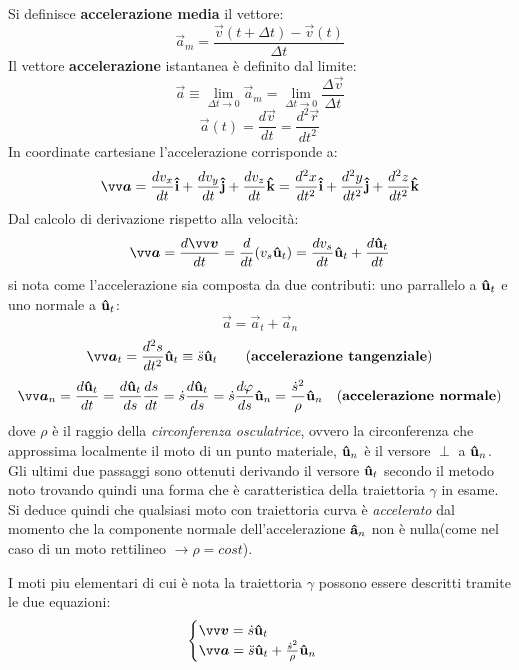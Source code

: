Si definisce \textbf{accelerazione media} il vettore:
\[
    \vec{a}_m = \frac{\vec{v}(t + \Delta t)-\vec{v}(t)}{\Delta t}      
\]
Il vettore \textbf{accelerazione} istantanea è definito dal limite:
\[
    \vec{a} \equiv \lim_{\Delta t \to 0} \vec{a}_m = \lim_{\Delta t \to 0} \frac{\Delta \vec{v}}{\Delta t}      
\]
\[
 \vec{a}(t) = \frac{d \vec{v}}{dt} = \frac{d^2\vec{r}}{dt^2}    
\]
In coordinate cartesiane l'accelerazione corrisponde a:
\[
    \vec{a} =  \frac{dv_x}{dt} \v{i} + \frac{dv_y}{dt} \v{j} + \frac{dv_z}{dt} \v{k}
    = \frac{d^2x}{dt^2} \v{i} + \frac{d^2y}{dt^2} \v{j} + \frac{d^2z}{dt^2} \v{k}
\]
Dal calcolo di derivazione rispetto alla velocità:
\[
    \vec{a} = \frac{d \vec{v}}{dt} = \frac{d}{dt} (v_s \v{u}_t) = \frac{dv_s}{dt}\v{u}_t
    + \frac{d\v{u}_t}{dt}
\]
si nota come l'accelerazione sia composta da due contributi: uno parrallelo a $\mathbf{\hat{u}}_t$ e uno normale a 
$\mathbf{\hat{u}}_t$:
\[
 \vec{a} = \vec{a}_t + \vec{a}_n   
\]
\[
 \vec{a}_t = \frac{d^2 s}{dt^2} \v{u}_t \equiv \ddot{s} \v{u}_t \qquad (\textbf{accelerazione tangenziale})
\]
\[
    \vec{a}_n = \frac{d\v{u}_t}{dt} = \frac{d\v{u}_t}{ds} \frac{ds}{dt} = \dot{s}\frac{d\v{u}_t}{ds}
    = \dot{s}\frac{d \varphi}{ds}\v{u}_n = \frac{\dot{s}^2}{\rho}\v{u}_n \quad (\textbf{accelerazione normale})    
\]
dove $\rho$ è il raggio della \emph{circonferenza osculatrice}, ovvero la circonferenza che approssima localmente il 
moto di un punto materiale, $\mathbf{\hat{u}}_n$ è il versore $\perp$ a $\mathbf{\hat{u}}_n$. 
Gli ultimi due passaggi sono ottenuti derivando il versore $\mathbf{\hat{u}}_t$ secondo il metodo noto trovando quindi una
forma che è caratteristica della traiettoria $\gamma$ in esame. \\
Si deduce quindi che qualsiasi moto con traiettoria curva è \emph{accelerato} dal momento che la componente normale
dell'accelerazione $\mathbf{\hat{a}}_n$ non è nulla(come nel caso di un moto rettilineo $\longrightarrow \rho = cost$).


I moti piu elementari di cui è nota la traiettoria $\gamma$ possono essere descritti tramite le due equazioni:
\[
  \begin{cases}
      \vec{v} = \dot{s}\v{u}_t \\ 
      \vec{a} = \ddot{s}\v{u}_t + \frac{\dot{s}^2}{\rho}\v{u}_n
  \end{cases}  
\]








